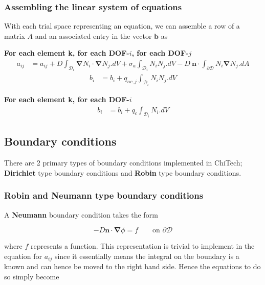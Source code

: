 \documentclass[11pt,letterpaper,titlepage]{article}
\newcommand{\bOmega}{\mathcal{D}}
\newcommand{\bnabla}{\boldsymbol{\nabla}}
\numberwithin{equation}{section}
\begin{document}
\subsubsection{Assembling the linear system of equations}
With each trial space representing an equation, we can assemble a row of a matrix $A$ and an associated entry in the vector $\mathbf{b}$ as
 
\vspace{0.25cm}
\textbf{For each element k, for each DOF-$i$, for each DOF-$j$}
\begin{equation}
\begin{aligned}
a_{ij} &=a_{ij} +  D \int_{\bOmega_i} \bnabla N_i  \cdot  \bnabla N_j .dV + 
\sigma_a \int_{\bOmega_i} N_i N_j.dV -
D \  \mathbf{n} \cdot \int_{\partial \bOmega} N_i  \bnabla N_j .dA 
\end{aligned}
\end{equation}
\begin{equation}
\begin{aligned}
b_i &= b_i 
+ q_{nc,j} \int_{\bOmega_i}  N_i  N_j .dV
\end{aligned}
\end{equation}

\textbf{For each element k, for each DOF-$i$}
\begin{equation}
\begin{aligned}
b_i &= b_i + q_c \int_{\bOmega_i} N_i   .dV 
\end{aligned}
\end{equation}

\subsection{Boundary conditions}
There are 2 primary types of boundary conditions implemented in ChiTech; \textbf{Dirichlet} type boundary conditions and \textbf{Robin} type boundary conditions.

\subsubsection{Robin and Neumann type boundary conditions}
A \textbf{Neumann} boundary condition takes the form

\begin{equation*}
-D \mathbf{n} \cdot \bnabla \phi = f \quad \quad \text{on } \partial \bOmega
\end{equation*}

where $f$ represents a function. This representation is trivial to implement in the equation for $a_{ij}$ since it essentially means the integral on the boundary is a known and can hence be moved to the right hand side. Hence the equations to do so simply become
\end{document}
